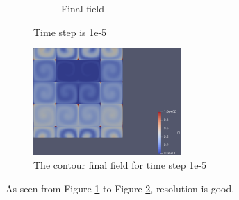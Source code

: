 \documentclass{article}
\begin{document}
\begin{figure}[hbt!]
\begin{subfigure}{0.4\textwidth}
        \caption{Final field}
  \end{subfigure}
  \caption{Time step is 1e-5}
  \label{t3m5_1} 
\end{figure}

\begin{figure}[hbt!]
    \centering
    \includegraphics[width=0.5\textwidth]{Figures/e-5 320x320/contour.png}
    \caption{The contour final field for time step 1e-5}
    \label{t3m5_2} 
\end{figure}

As seen from Figure \ref{t3m5_1} to Figure \ref{t3m5_2}, resolution is good.



\clearpage
\end{document}

